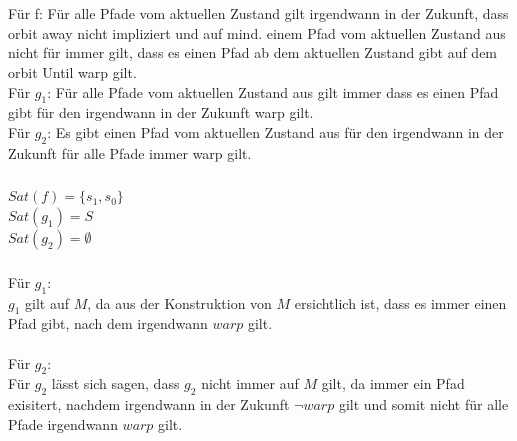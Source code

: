 \documentclass[a4paper,12pt]{scrartcl}
\title{\blatt}
\date{Gruppe 06}
\author{Sabrina Buczko 6663234, Julian Deinert 6535880, Rafael Heid 6704828}
\begin{document}
\maketitle
\newpage
\setcounter{section}{4}
\section{}
\setcounter{subsection}{2}
\subsection{}
\subsubsection{}

\subsubsection{}
Für f: Für alle Pfade vom aktuellen Zustand gilt irgendwann in der Zukunft, dass orbit away nicht impliziert und auf mind. einem Pfad vom aktuellen Zustand aus nicht für immer gilt, dass es einen Pfad ab dem aktuellen Zustand gibt auf dem orbit Until warp gilt.\\
Für $g_1$: Für alle Pfade vom aktuellen Zustand aus gilt immer dass es einen Pfad gibt für den irgendwann in der Zukunft warp gilt.\\
Für $g_2$: Es gibt einen Pfad vom aktuellen Zustand aus für den irgendwann in der Zukunft für alle Pfade immer warp gilt.

\subsubsection{}
$Sat(f)= \{s_1, s_0\}$\\
$Sat(g_1)= S$\\
$Sat(g_2)= \emptyset$
\subsubsection{}
Für $g_1$:\\
$g_1$ gilt auf $M$, da aus der Konstruktion von $M$ ersichtlich ist, 
dass es immer einen Pfad gibt, nach dem irgendwann $warp$ gilt.\\\\
Für $g_2$:\\
Für $g_2$ lässt sich sagen, dass $g_2$ nicht immer auf $M$ gilt, da immer ein Pfad exisitert, nachdem irgendwann in der Zukunft $\neg warp$ gilt und somit nicht für alle Pfade irgendwann $warp$ gilt.
\end{document}
